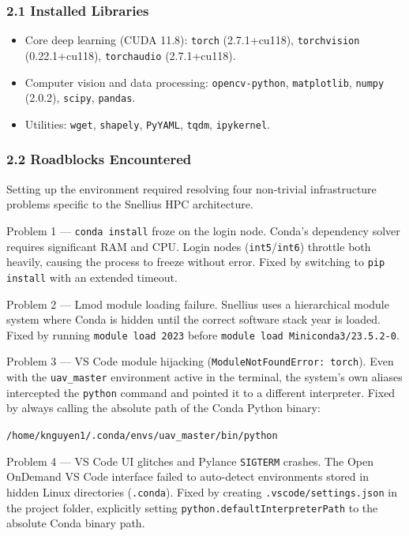 \subsubsection*{2.1 Installed Libraries}

\begin{itemize}
    \item Core deep learning (CUDA 11.8): \texttt{torch}
          (2.7.1+cu118), \texttt{torchvision} (0.22.1+cu118),
          \texttt{torchaudio} (2.7.1+cu118).
    \item Computer vision and data processing:
          \texttt{opencv-python}, \texttt{matplotlib},
          \texttt{numpy} (2.0.2), \texttt{scipy}, \texttt{pandas}.
    \item Utilities: \texttt{wget}, \texttt{shapely},
          \texttt{PyYAML}, \texttt{tqdm}, \texttt{ipykernel}.
\end{itemize}

\subsubsection*{2.2 Roadblocks Encountered}

Setting up the environment required resolving four non-trivial
infrastructure problems specific to the Snellius HPC architecture.

Problem 1 — \texttt{conda install} froze on the login node.
Conda's dependency solver requires significant RAM and CPU. Login nodes
(\texttt{int5}/\texttt{int6}) throttle both heavily, causing the process
to freeze without error. Fixed by switching to \texttt{pip install} with
an extended timeout.

Problem 2 — Lmod module loading failure.
Snellius uses a hierarchical module system where Conda is hidden until
the correct software stack year is loaded. Fixed by running
\texttt{module load 2023} before \texttt{module load Miniconda3/23.5.2-0}.

Problem 3 — VS Code module hijacking (\texttt{ModuleNotFoundError: torch}).
Even with the \texttt{uav\_master} environment active in the terminal,
the system's own aliases intercepted the \texttt{python} command and
pointed it to a different interpreter. Fixed by always calling the
absolute path of the Conda Python binary:
\begin{center}
\texttt{/home/knguyen1/.conda/envs/uav\_master/bin/python}
\end{center}

Problem 4 — VS Code UI glitches and Pylance \texttt{SIGTERM} crashes.
The Open OnDemand VS Code interface failed to auto-detect environments
stored in hidden Linux directories (\texttt{.conda}). Fixed by creating
\texttt{.vscode/settings.json} in the project folder, explicitly setting
\texttt{python.defaultInterpreterPath} to the absolute Conda binary path.

